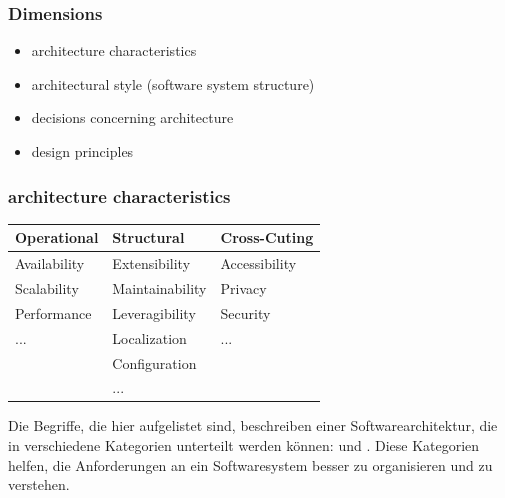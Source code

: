 \subsubsection*{Dimensions}
\begin{defBox}[title=Software architecture encompasses ...]
    \begin{itemize}
        \item architecture characteristics
        \item architectural style (software system structure)
        \item decisions concerning architecture
        \item design principles
    \end{itemize}
\end{defBox}
\subsubsection*{architecture characteristics}
\begin{center}
    \begin{tabular}{lll}
        \toprule
        Operational & Structural & Cross-Cuting \\
        \midrule
        Availability & Extensibility & Accessibility \\
        Scalability & Maintainability & Privacy \\
        Performance & Leveragibility & Security \\
        ... & Localization & ... \\
        & Configuration & \\
         & ... & \\
        \bottomrule
    \end{tabular}
\end{center}
\begin{infoBox}
    Die Begriffe, die hier aufgelistet sind, beschreiben  einer Softwarearchitektur, die in verschiedene Kategorien unterteilt werden können:  und . Diese Kategorien helfen, die Anforderungen an ein Softwaresystem besser zu organisieren und zu verstehen.
\end{infoBox}
